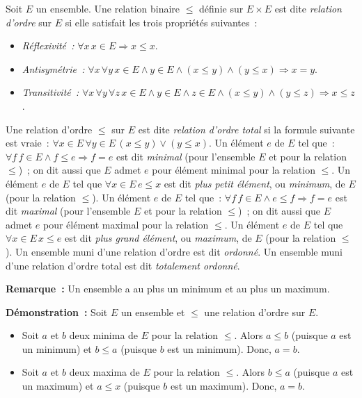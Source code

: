 Soit $E$ un ensemble. 
Une relation binaire $\leq$ définie sur $E \times E$ est dite \textit{relation d'ordre} sur $E$ si elle satisfait les trois propriétés suivantes : 
\begin{itemize}[nosep]
    \item \textit{Réflexivité :} $\forall x \, x \in E \Rightarrow x \leq x$.
    \item \textit{Antisymétrie :} $\forall x \, \forall y \, x \in E \wedge y \in E \wedge (x \leq y) \wedge (y \leq x) \Rightarrow x = y$.
    \item \textit{Transitivité :} $\forall x \, \forall y \, \forall z \, x \in E \wedge y \in E \wedge z \in E \wedge (x \leq y) \mathrel{\wedge} (y \leq z) \Rightarrow x \leq z$.
\end{itemize}
Une relation d'ordre $\leq$ sur $E$ est dite \textit{relation d'ordre total} si la formule suivante est vraie : $\forall x \in E \, \forall y \in E \, (x \leq y) \vee (y \leq x)$.
Un élément $e$ de $E$ tel que : $\forall f \, f \in E \wedge f \leq e \Rightarrow f = e$ est dit \textit{minimal} (pour l'ensemble $E$ et pour la relation $\leq$) ; on dit aussi que $E$ admet $e$ pour élément minimal pour la relation $\leq$. 
Un élément $e$ de $E$ tel que $\forall x \in E \, e \leq x$ est dit \textit{plus petit élément}, ou \textit{minimum}, de $E$ (pour la relation $\leq$).
Un élément $e$ de $E$ tel que : $\forall f \, f \in E \wedge e \leq f \Rightarrow f = e$ est dit \textit{maximal} (pour l'ensemble $E$ et pour la relation $\leq$) ; on dit aussi que $E$ admet $e$ pour élément maximal pour la relation $\leq$. 
Un élément $e$ de $E$ tel que $\forall x \in E \, x \leq e$ est dit \textit{plus grand élément}, ou \textit{maximum}, de $E$ (pour la relation $\leq$).
Un ensemble muni d'une relation d'ordre est dit \textit{ordonné}.
Un ensemble muni d'une relation d'ordre total est dit \textit{totalement ordonné}.

\medskip

\noindent\textbf{Remarque :} Un ensemble a au plus un minimum et au plus un maximum. 

\medskip

\noindent\textbf{Démonstration :} Soit $E$ un ensemble et $\leq$ une relation d'ordre sur $E$. 
\begin{itemize}[nosep]
    \item Soit $a$ et $b$ deux minima de $E$ pour la relation $\leq$. 
        Alors $a \leq b$ (puisque $a$ est un minimum) et $b \leq a$ (puisque $b$ est un minimum).
        Donc, $a = b$.
    \item Soit $a$ et $b$ deux maxima de $E$ pour la relation $\leq$. 
        Alors $b \leq a$ (puisque $a$ est un maximum) et $a \leq x$ (puisque $b$ est un maximum).
        Donc, $a = b$.
\end{itemize}

